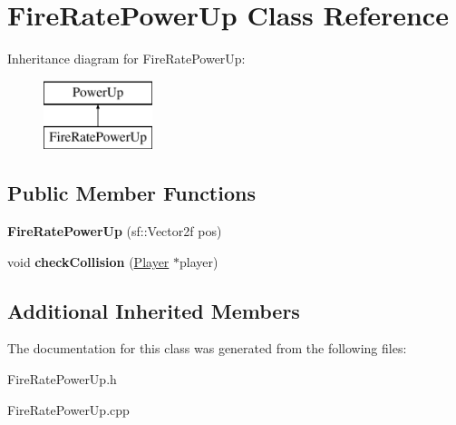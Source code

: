 \hypertarget{class_fire_rate_power_up}{}\section{Fire\+Rate\+Power\+Up Class Reference}
\label{class_fire_rate_power_up}
Inheritance diagram for Fire\+Rate\+Power\+Up\+:\begin{figure}[H]
\begin{center}
\leavevmode
\includegraphics[height=2.000000cm]{class_fire_rate_power_up}
\end{center}
\end{figure}
\subsection*{Public Member Functions}
\begin{DoxyCompactItemize}
\item 
\mbox{\label{class_fire_rate_power_up_a70d9addd3e9d0d7ad3d4a26f0ae65bc9}} 
{\bfseries Fire\+Rate\+Power\+Up} (sf\+::\+Vector2f pos)
\item 
\mbox{\label{class_fire_rate_power_up_a728e0416b3523ba8922ac0880887d327}} 
void {\bfseries check\+Collision} (\mbox{\hyperlink{class_player}{Player}} $\ast$player)
\end{DoxyCompactItemize}
\subsection*{Additional Inherited Members}


The documentation for this class was generated from the following files\+:\begin{DoxyCompactItemize}
\item 
Fire\+Rate\+Power\+Up.\+h\item 
Fire\+Rate\+Power\+Up.\+cpp\end{DoxyCompactItemize}
